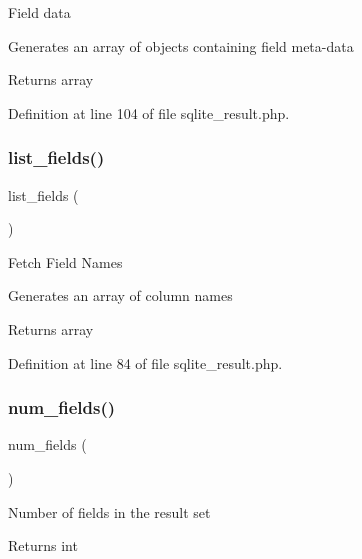 Field data

Generates an array of objects containing field meta-\/data

\begin{DoxyReturn}{Returns}
array 
\end{DoxyReturn}


Definition at line 104 of file sqlite\+\_\+result.\+php.

\mbox{\label{class_c_i___d_b__sqlite__result_a50b54eb4ea7cfd039740f532988ea776}} 
\subsubsection{\texorpdfstring{list\_fields()}{list\_fields()}}
{\footnotesize\ttfamily list\+\_\+fields (\begin{DoxyParamCaption}{ }\end{DoxyParamCaption})}

Fetch Field Names

Generates an array of column names

\begin{DoxyReturn}{Returns}
array 
\end{DoxyReturn}


Definition at line 84 of file sqlite\+\_\+result.\+php.

\mbox{\label{class_c_i___d_b__sqlite__result_af831bf363e4d7d661a717a4932af449d}} 
\subsubsection{\texorpdfstring{num\_fields()}{num\_fields()}}
{\footnotesize\ttfamily num\+\_\+fields (\begin{DoxyParamCaption}{ }\end{DoxyParamCaption})}

Number of fields in the result set

\begin{DoxyReturn}{Returns}
int 
\end{DoxyReturn}


